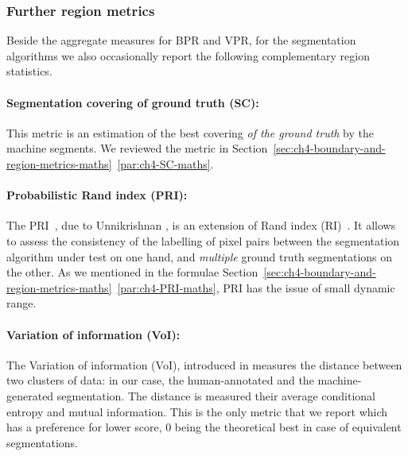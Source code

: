 
\subsubsection*{Further region metrics}
Beside the aggregate measures for BPR and VPR, for the segmentation algorithms we also occasionally report the following complementary %
region statistics. %
\paragraph{Segmentation covering of ground truth (SC):} This metric is an estimation of the best covering {\it of the ground truth} by the machine segments. We reviewed the metric in Section~\ref*{sec:ch4-boundary-and-region-metrics-maths}~\ref{par:ch4-SC-maths}.

\paragraph{Probabilistic Rand index (PRI):} The PRI~\cite{UnnikrishnanPH07}, due to Unnikrishnan \etal, is an extension of Rand index (RI)~\cite{rand1971objective}. It allows to assess the consistency of the labelling of pixel pairs between the segmentation algorithm under test on one hand, and {\it multiple} ground truth segmentations on the other. %
As we mentioned in the formulae Section~\ref*{sec:ch4-boundary-and-region-metrics-maths}~\ref{par:ch4-PRI-maths}, PRI has the issue %
of small dynamic range.

\paragraph{Variation of information (VoI):} The Variation of information (VoI), introduced in \cite{Meila05} measures the distance between two clusters of data: in our case, the human-annotated and the machine-generated segmentation. The distance is measured \wrt %
their average conditional entropy and mutual information. This is the only metric that we report which has a preference for lower score, $0$ being the theoretical best in case of equivalent segmentations.

